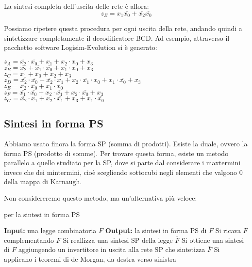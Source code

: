\documentclass[a4paper,11pt]{article}
\begin{document}
La sintesi completa dell'uscita delle rete è allora:
$$ z_E = x_1 \overline{x_0} + \overline{x_2}\overline{x_0} $$

Possiamo ripetere questa procedura per ogni uscita della rete, andando quindi a sintetizzare completamente il decodificatore BCD.
Ad esempio, attraverso il pacchetto software Logisim-Evolution si è generato: 
\par\smallskip
\noindent
$z_A =  \overline{x_2}  \cdot  \overline{x_0} +x_1+x_2 \cdot x_0+x_3$\\
$z_B =  \overline{x_2} + \overline{x_1}  \cdot  \overline{x_0} +x_1 \cdot x_0+x_3$\\
$z_C =  \overline{x_1} +x_0+x_2+x_3$\\
$z_D =  \overline{x_2}  \cdot  \overline{x_0} + \overline{x_2}  \cdot x_1+x_2 \cdot  \overline{x_1}  \cdot x_0+x_1 \cdot  \overline{x_0} +x_3$\\
$z_E =  \overline{x_2}  \cdot  \overline{x_0} +x_1 \cdot  \overline{x_0} $\\
$z_F =  \overline{x_1}  \cdot  \overline{x_0} +x_2 \cdot  \overline{x_1} +x_2 \cdot  \overline{x_0} +x_3$\\
$z_G =  \overline{x_2}  \cdot x_1+x_2 \cdot  \overline{x_1} +x_3+x_1 \cdot  \overline{x_0} $

\subsection{Sintesi in forma PS}
Abbiamo usato finora la forma SP (somma di prodotti).
Esiste la duale, ovvero la forma PS (prodotto di somme).
Per trovare questa forma, esiste un metodo parallelo a quello studiato per la SP, dove si parte dal considerare i maxtermini invece che dei mintermini, cioè scegliendo sottocubi negli elementi che valgono 0 della mappa di Karnaugh.

Non considereremo questo metodo, ma un'alternativa più veloce:

\begin{algorithm}
\caption{per la sintesi in forma PS}
\begin{algorithmic}
	\STATE \textbf{Input:} una legge combinatoria $F$
	\STATE \textbf{Output:} la sintesi in forma PS di $F$
	\STATE Si ricava $\overline{F}$ complementando $F$
	\STATE Si reallizza una sintesi SP della legge $\overline{F}$
	\STATE Si ottiene una sintesi di $F$ aggiungendo un invertitore in uscita alla rete SP che sintetizza $\overline{F}$
	\STATE Si applicano i teoremi di de Morgan, da destra verso sinistra
\end{algorithmic}
\end{algorithm}
\end{document}
